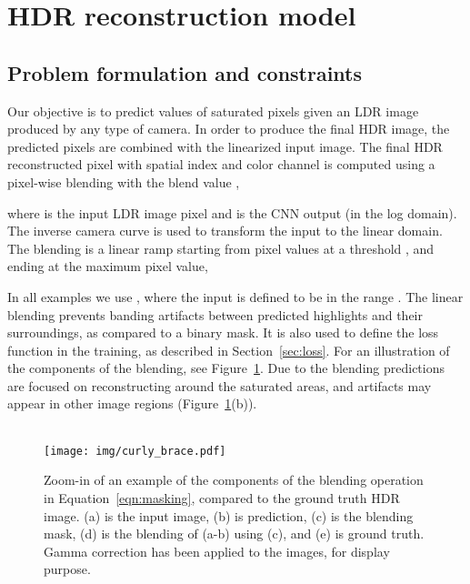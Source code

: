 \documentclass[acmtog]{acmart}
\newcommand{\figref}[1]{Figure~\ref{fig:#1}}
\newcommand{\eqnref}[1]{Equation~\ref{eqn:#1}}
\newcommand{\secref}[1]{Section~\ref{sec:#1}}
\newcommand\belowfigspace{-2pt}
\begin{document}
\section{HDR reconstruction model}\label{sec:method}

\subsection{Problem formulation and constraints}\label{sec:problem}
Our objective is to predict values of saturated pixels given an LDR image produced by any type of camera. In order to produce the final HDR image, the predicted pixels are combined with the linearized input image. The final HDR reconstructed pixel  with spatial index  and color channel  is computed using a pixel-wise blending with the blend value ,

where  is the input LDR image pixel and  is the CNN output (in the log domain). The inverse camera curve  is used to transform the input to the linear domain. The blending is a linear ramp starting from pixel values at a threshold , and ending at the maximum pixel value, 

 In all examples we use , where the input is defined to be in the range . The linear blending prevents banding artifacts between predicted highlights and their surroundings, as compared to a binary mask. It is also used to define the loss function in the training, as described in \secref{loss}. For an illustration of the components of the blending, see \figref{msk}. Due to the blending predictions are focused on reconstructing around the saturated areas, and artifacts may appear in other image regions (\figref{msk}(b)).

\begin{figure}[t]
	\newcommand\ww{0.13}
	\centering
	\\
	\vspace{-5pt}
	\texttt{[image: img/curly\_brace.pdf]}\\
	\vspace{-2pt}
	\hspace{10pt}
	\vspace{-10pt}
	\caption{\label{fig:msk} Zoom-in of an example of the components of the blending operation in \eqnref{masking}, compared to the ground truth HDR image. (a) is the input image, (b) is prediction, (c) is the blending mask, (d) is the blending of (a-b) using (c), and (e) is ground truth. Gamma correction has been applied to the images, for display purpose.}
	\vspace{\belowfigspace}
\end{figure}
\end{document}
